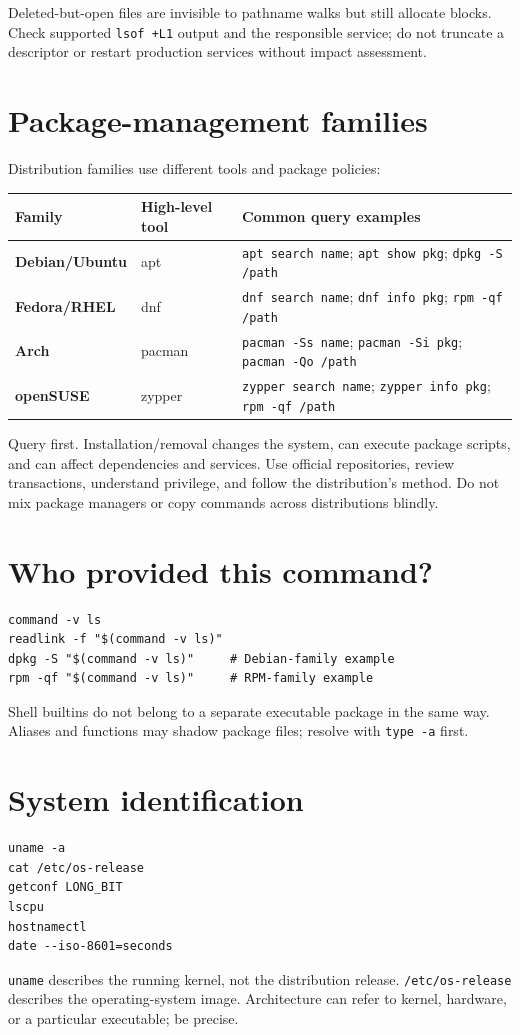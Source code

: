 \documentclass[11pt,oneside,openany]{book}
\begin{document}
Deleted-but-open files are invisible to pathname walks but still allocate blocks. Check supported \texttt{lsof +L1} output and the responsible service; do not truncate a descriptor or restart production services without impact assessment.

\section{Package-management families}
Distribution families use different tools and package policies:
\begin{center}
\begin{tabularx}{0.96\textwidth}{>{\bfseries}p{}>{\ttfamily}p{}X}
\toprule
Family & High-level tool & Common query examples \\
\midrule
Debian/Ubuntu & apt & \texttt{apt search name}; \texttt{apt show pkg}; \texttt{dpkg -S /path} \\
Fedora/RHEL & dnf & \texttt{dnf search name}; \texttt{dnf info pkg}; \texttt{rpm -qf /path} \\
Arch & pacman & \texttt{pacman -Ss name}; \texttt{pacman -Si pkg}; \texttt{pacman -Qo /path} \\
openSUSE & zypper & \texttt{zypper search name}; \texttt{zypper info pkg}; \texttt{rpm -qf /path} \\
\bottomrule
\end{tabularx}
\end{center}
Query first. Installation/removal changes the system, can execute package scripts, and can affect dependencies and services. Use official repositories, review transactions, understand privilege, and follow the distribution's method. Do not mix package managers or copy commands across distributions blindly.

\section{Who provided this command?}
\begin{lstlisting}
command -v ls
readlink -f "$(command -v ls)"
dpkg -S "$(command -v ls)"     # Debian-family example
rpm -qf "$(command -v ls)"     # RPM-family example
\end{lstlisting}
Shell builtins do not belong to a separate executable package in the same way. Aliases and functions may shadow package files; resolve with \texttt{type -a} first.

\section{System identification}
\begin{lstlisting}
uname -a
cat /etc/os-release
getconf LONG_BIT
lscpu
hostnamectl
date --iso-8601=seconds
\end{lstlisting}
\texttt{uname} describes the running kernel, not the distribution release. \texttt{/etc/os-release} describes the operating-system image. Architecture can refer to kernel, hardware, or a particular executable; be precise.
\end{document}
